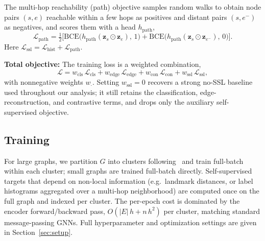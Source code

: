 The multi-hop reachability (path) objective samples random walks to obtain node pairs $(s,e)$ reachable within a few hops as positives and distant pairs $(s,e^-)$ as negatives, and scores them with a head $h_{\text{path}}$,
\begin{equation}
    \label{eq:path}
    \mathcal{L}_{\text{path}} = \tfrac{1}{2}\Big[
        \mathrm{BCE}\big(h_{\text{path}}(\mathbf{z}_s\!\odot\!\mathbf{z}_e),\,1\big)
        + \mathrm{BCE}\big(h_{\text{path}}(\mathbf{z}_s\!\odot\!\mathbf{z}_{e^-}),\,0\big)
    \Big].
\end{equation}
Here $\mathcal{L}_{\text{ssl}}=\mathcal{L}_{\text{hist}}+\mathcal{L}_{\text{path}}$.


\textbf{Total objective:}
The training loss is a weighted combination,
\begin{equation}
    \label{eq:total}
    \mathcal{L}
    = w_{\text{cls}}\,\mathcal{L}_{\text{cls}}
    + w_{\text{edge}}\,\mathcal{L}_{\text{edge}}
    + w_{\text{con}}\,\mathcal{L}_{\text{con}}
    + w_{\text{ssl}}\,\mathcal{L}_{\text{ssl}},
\end{equation}
with nonnegative weights $w_{\cdot}$. Setting $w_{\text{ssl}}=0$ recovers a strong
no-SSL baseline used throughout our analysis; it still retains the classification, edge-reconstruction, and contrastive terms, and drops only the auxiliary self-supervised objective.

\subsection{Training}
\label{sec:method-training}
For large graphs, we partition $G$ into clusters following~\cite{chiang2019cluster} and train
full-batch within each cluster; small graphs are trained full-batch directly.
Self-supervised targets that depend on non-local information (e.g.\ landmark distances, or
label histograms aggregated over a multi-hop neighborhood) are computed once on the full graph and indexed per cluster.
The per-epoch cost is dominated by the
encoder forward/backward pass, $O(|E|\,h + n\,h^2)$ per cluster, matching standard
message-passing GNNs. Full hyperparameter and optimization settings are given in Section~\ref{sec:setup}.
